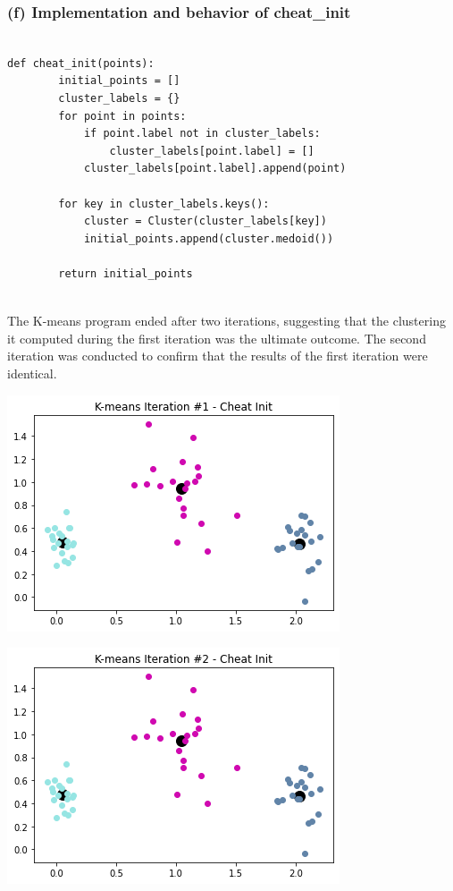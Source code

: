 \documentclass[11pt]{article}
\newcommand{\sol}[1]{{\bf{\color{magenta}{{Solution:}}}}}
\begin{document}
\subsubsection{(f) Implementation and behavior of cheat\_init}
\sol x
\begin{verbatim}

def cheat_init(points):
        initial_points = []
        cluster_labels = {}
        for point in points:
            if point.label not in cluster_labels:
                cluster_labels[point.label] = []
            cluster_labels[point.label].append(point)
        
        for key in cluster_labels.keys():
            cluster = Cluster(cluster_labels[key])
            initial_points.append(cluster.medoid())
        
        return initial_points
        
\end{verbatim}

The K-means program ended after two iterations, suggesting that the clustering it computed during the first iteration was the ultimate outcome. The second iteration was conducted to confirm that the results of the first iteration were identical.

\begin{center}
    \includegraphics[scale=0.6]{2f-1.png}
\end{center}

\begin{center}
    \includegraphics[scale=0.6]{2f-2.png}
\end{center}
\end{document}
